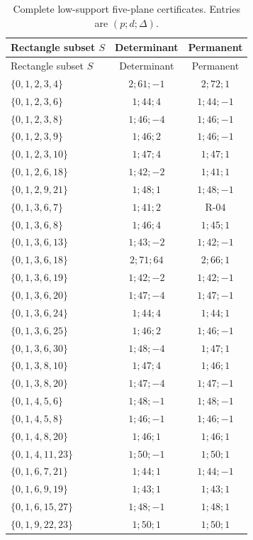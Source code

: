{\small
\begin{longtable}{@{}lcc@{}}
\caption{Complete low-support five-plane certificates.
Entries are \((p;d;\Delta)\).}
\label{tab:five-minors}\\
\toprule
Rectangle subset \(S\)&Determinant&Permanent\\
\midrule
\endfirsthead
\toprule
Rectangle subset \(S\)&Determinant&Permanent\\
\midrule
\endhead
\(\{0,1,2,3,4\}\) & \(2;61;-1\) & \(2;72;1\) \\
\(\{0,1,2,3,6\}\) & \(1;44;4\) & \(1;44;-1\) \\
\(\{0,1,2,3,8\}\) & \(1;46;-4\) & \(1;46;-1\) \\
\(\{0,1,2,3,9\}\) & \(1;46;2\) & \(1;46;-1\) \\
\(\{0,1,2,3,10\}\) & \(1;47;4\) & \(1;47;1\) \\
\(\{0,1,2,6,18\}\) & \(1;42;-2\) & \(1;41;1\) \\
\(\{0,1,2,9,21\}\) & \(1;48;1\) & \(1;48;-1\) \\
\(\{0,1,3,6,7\}\) & \(1;41;2\) & \(\text{R-04}\) \\
\(\{0,1,3,6,8\}\) & \(1;46;4\) & \(1;45;1\) \\
\(\{0,1,3,6,13\}\) & \(1;43;-2\) & \(1;42;-1\) \\
\(\{0,1,3,6,18\}\) & \(2;71;64\) & \(2;66;1\) \\
\(\{0,1,3,6,19\}\) & \(1;42;-2\) & \(1;42;-1\) \\
\(\{0,1,3,6,20\}\) & \(1;47;-4\) & \(1;47;-1\) \\
\(\{0,1,3,6,24\}\) & \(1;44;4\) & \(1;44;1\) \\
\(\{0,1,3,6,25\}\) & \(1;46;2\) & \(1;46;-1\) \\
\(\{0,1,3,6,30\}\) & \(1;48;-4\) & \(1;47;1\) \\
\(\{0,1,3,8,10\}\) & \(1;47;4\) & \(1;46;1\) \\
\(\{0,1,3,8,20\}\) & \(1;47;-4\) & \(1;47;-1\) \\
\(\{0,1,4,5,6\}\) & \(1;48;-1\) & \(1;48;-1\) \\
\(\{0,1,4,5,8\}\) & \(1;46;-1\) & \(1;46;-1\) \\
\(\{0,1,4,8,20\}\) & \(1;46;1\) & \(1;46;1\) \\
\(\{0,1,4,11,23\}\) & \(1;50;-1\) & \(1;50;1\) \\
\(\{0,1,6,7,21\}\) & \(1;44;1\) & \(1;44;-1\) \\
\(\{0,1,6,9,19\}\) & \(1;43;1\) & \(1;43;1\) \\
\(\{0,1,6,15,27\}\) & \(1;48;-1\) & \(1;48;1\) \\
\(\{0,1,9,22,23\}\) & \(1;50;1\) & \(1;50;1\) \\
\bottomrule
\end{longtable}
}

